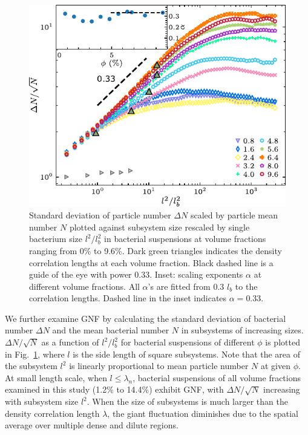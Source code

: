 \begin{figure}[!h]
\begin{center}
\includegraphics[width=4.5in]{figs/5-GNF/4.pdf}
\caption[Giant number fluctuations in active turbulence]
{
Standard deviation of particle number $\Delta N$ scaled by particle mean number $N$ plotted against subsystem size rescaled by single bacterium size $l^2/l_b^2$ in bacterial suspensions at volume fractions ranging from 0\% to 9.6\%. Dark green triangles indicates the density correlation lengths at each volume fraction. Black dashed line is a guide of the eye with power 0.33. Inset: scaling exponents $\alpha$ at different volume fractions. All $\alpha$'s are fitted from 0.3 $l_b$ to the correlation lengths. Dashed line in the inset indicates $\alpha=0.33$.
}
\label{fig:GNF}
\end{center}
\end{figure}

We further examine GNF by calculating the standard deviation of bacterial number $\Delta N$ and the mean bacterial number $N$ in subsystems of increasing sizes. $\Delta N / \sqrt N$ as a function of $l^2/l_b^2$ for bacterial suspensions of different $\phi$ is plotted in Fig.~\ref{fig:GNF}, where $l$ is the side length of square subsystems.
Note that the area of the subsystem $l^2$ is linearly proportional to mean particle number $N$ at given $\phi$. At small length scale, when $l\le\lambda_n$, bacterial suspensions of all volume fractions examined in this study (1.2\% to 14.4\%) exhibit GNF, with $\Delta N/\sqrt N$ increasing with subsystem size $l^2$. When the size of subsystems is much larger than the density correlation length $\lambda$, the giant fluctuation diminishes due to the spatial average over multiple dense and dilute regions.

